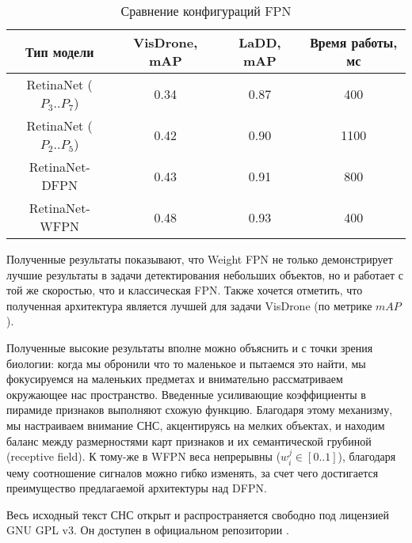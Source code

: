 \begin{table}[H]
    \caption{Сравнение конфигураций FPN}\label{leaderboard-full}
    \begin{tabular}{|c|c|c|c|}
        \hline
        {Тип модели} & {VisDrone, mAP} & {LaDD, mAP} & Время работы, мс \\
        \hline
        RetinaNet ($P_3..P_7$) & 0.34 & 0.87 & 400 \\
        \hline
        RetinaNet ($P_2..P_5$) & 0.42 & 0.90 & 1100 \\
        \hline
        RetinaNet-DFPN & 0.43 & 0.91 & 800 \\
        \hline
        RetinaNet-WFPN & 0.48 & 0.93 & 400 \\
        \hline
    \end{tabular}
\end{table}

Полученные результаты показывают, что Weight FPN не только демонстрирует лучшие результаты в задачи детектирования небольших объектов, но и работает с той же скоростью, что и классическая FPN. Также хочется отметить, что полученная архитектура является лучшей для задачи VisDrone (по метрике $mAP$). 


Полученные высокие результаты вполне можно объяснить и с точки зрения биологии: когда мы обронили что то маленькое и пытаемся это найти, мы фокусируемся на маленьких предметах и внимательно рассматриваем окружающее нас пространство. Введенные усиливающие коэффициенты в пирамиде признаков выполняют схожую функцию. Благодаря этому механизму, мы настраиваем внимание СНС, акцентируясь на мелких объектах, и находим баланс между размерностями карт признаков и их семантической грубиной (receptive field). К тому-же в WFPN веса непрерывны ($w^j_i\in[0..1]$), благодаря чему соотношение сигналов можно гибко изменять, за счет чего достигается преимущество предлагаемой архитектуры над DFPN.

Весь исходный текст СНС открыт и распространяется свободно под лицензией GNU GPL v3. Он доступен в официальном репозитории \cite{lib-lacmus}.